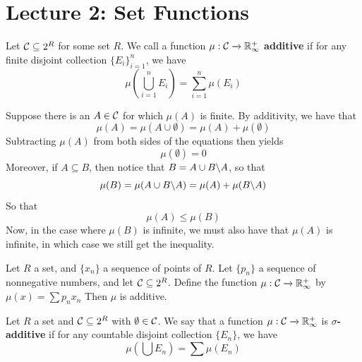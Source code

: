 \section*{Lecture 2: Set Functions}

\begin{definition}
    Let $\mathcal{C} \subseteq 2^R$ for some set $R$. We call a function $\mu:\mathcal{C}
    \xrightarrow{} \mathbb{R}^+_{\infty}$ \textbf{additive} if for any finite disjoint
    collection $\{E_i\}_{i=1}^n$, we have
    \begin{equation*}
        \mu(\bigcup_{i=1}^n{E_i})=\sum_{i=1}^n{\mu(E_i)}
    \end{equation*}
\end{definition}

Suppose there is an $A \in \mathcal{C}$ for which $\mu(A)$ is finite. By additivity, we
have that
\begin{equation*}
    \mu(A)=\mu(A \cup \emptyset)=\mu(A)+\mu(\emptyset)
\end{equation*}
Subtracting $\mu(A)$ from both sides of the equations then yields
\begin{equation*}
    \mu(\emptyset)=0
\end{equation*}
Moreover, if $A \subseteq B$, then notice that  $B=A \cup B\backslash A$, so that
\begin{equation*}
    \mu(B)=\mu(A \cup B\backslash A)=\mu(A)+\mu(B\backslash A)
\end{equation*}
So that
\begin{equation}
    \mu(A) \leq \mu(B)
\end{equation}
Now, in the case where $\mu(B)$ is infinite, we must also have that $\mu(A)$ is
infinite, in which case we still get the inequality.

\begin{example}\label{example_2}
    Let $R$ a set, and  $\{x_n\}$ a sequence of points of $R$. Let  $\{p_n\}$ a
    sequence of nonnegative numbers, and let $\mathcal{C} \subseteq 2^R$. Define the
    function  $\mu:\mathcal{C} \xrightarrow{} \mathbb{R}^+_\infty$ by $\mu(x)=\sum{p_nx_n}$
    Then $\mu$ is additive.
\end{example}

\begin{definition}
    Let $R$ a set and $\mathcal{C} \subseteq 2^R$ with $\emptyset \in \mathcal{C}$. We say that
    a function $\mu:\mathcal{C} \xrightarrow{} \mathbb{R}^+_\infty$ is
    \textbf{$\sigma$-additive} if for any countable disjoint collection
    $\{E_n\}$, we have
    \begin{equation*}
        \mu(\bigcup{E_n})=\sum{\mu(E_n)}
    \end{equation*}
\end{definition}

